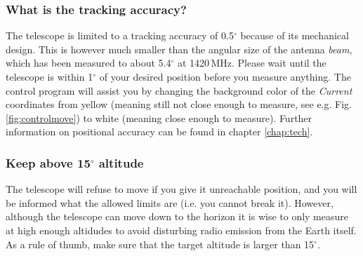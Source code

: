 \subsubsection{What is the tracking accuracy?}
The telescope is limited to a tracking accuracy of 0.5$^\circ$
because of its mechanical design. This is however much smaller than the angular
size of the antenna \emph{beam}, which has been measured to about 5.4$^\circ$
at 1420\,MHz.  Please wait until the telescope is within 1$^\circ$ of your
desired position before you measure anything.  The control program will assist
you by changing the background color of the \emph{Current} coordinates from
yellow (meaning still not close enough to measure, see e.g. Fig.
\ref{fig:controlmove}) to white (meaning close enough to measure).  Further
information on positional accuracy can be found in chapter \ref{chap:tech}.

\subsubsection{Keep above 15$^\circ$ altitude}
The telescope will refuse to move if you give it unreachable position, and you
will be informed what the allowed limits are (i.e. you cannot break it).
However, although the telescope can move down to the horizon it is wise to only
measure at high enough altidudes to avoid disturbing radio emission from the
Earth itself.  As a rule of thumb, make sure that the target altitude is larger
than 15$^\circ$.

